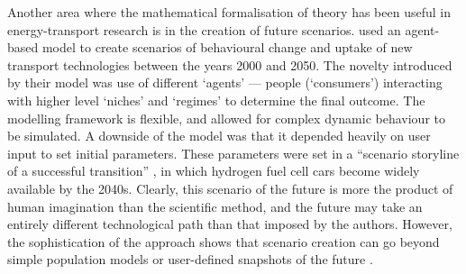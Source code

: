Another area where the mathematical formalisation of theory has been useful in
energy-transport research is in the creation of future scenarios.
\citet{Kohler2009} used an agent-based model to create scenarios of behavioural
change and uptake of new transport technologies between the years 2000 and
2050. The novelty introduced by their model was use of different `agents' ---
people (`consumers') interacting with higher level `niches' and `regimes' to
determine the final outcome. The modelling framework is flexible, and allowed
for complex dynamic behaviour to be simulated. A downside of the model was
that it depended heavily on user input to set initial parameters. These
parameters were set in a
``scenario storyline of a successful transition'' \citep[p.~2988]{Kohler2009},
in which hydrogen fuel
cell cars become widely available by the 2040s. Clearly, this scenario of the
future is more the product of human imagination than the scientific method,
and the future may take an entirely different technological path than that
imposed by the authors.
However, the sophistication of the approach shows that scenario creation
can go beyond simple population models \citep{Lovelace2011-assessing} or
user-defined snapshots of the future \citep{Akerman2006}.

